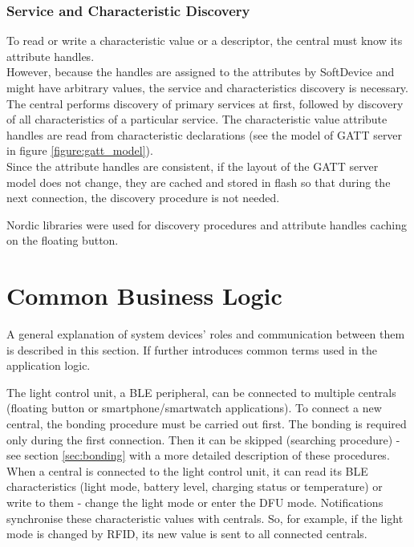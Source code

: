         \subsubsection{Service and Characteristic Discovery}
            To read or write a characteristic value or a descriptor, the central must know its attribute handles.\\ 
            However, because the handles are assigned to the attributes by SoftDevice and might have arbitrary values, the service and characteristics discovery is necessary. The central performs discovery of primary services at first, followed by discovery of all characteristics of a particular service. The characteristic value attribute handles are read from characteristic declarations (see the model of GATT server in figure \ref{figure:gatt_model}).\\
            Since the attribute handles are consistent, if the layout of the GATT server model does not change, they are cached and stored in flash so that during the next connection, the discovery procedure is not needed.
            
            Nordic libraries were used for discovery procedures and attribute handles caching on the floating button.


          
\section{Common Business Logic}
    \label{sec:app_businnes_logic}
    A general explanation of system devices' roles and communication between them is described in this section. If further introduces common terms used in the application logic.
    
    The light control unit, a BLE peripheral, can be connected to multiple centrals (floating button or smartphone/smartwatch applications). To connect a new central, the bonding procedure must be carried out first. The bonding is required only during the first connection. Then it can be skipped (searching procedure) - see section \ref{sec:bonding} with a more detailed description of these procedures.\\
    When a central is connected to the light control unit, it can read its BLE characteristics (light mode, battery level, charging status or temperature) or write to them - change the light mode or enter the DFU mode. Notifications synchronise these characteristic values with centrals. So, for example, if the light mode is changed by RFID, its new value is sent to all connected centrals.\\
    
